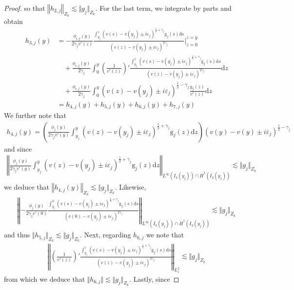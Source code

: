 \documentclass[11pt,reqno]{amsproc}
\theoremstyle{definition}
\numberwithin{equation}{section}
\newcommand{\sr}{{\mathsf{r}}}
\renewcommand{\d}{\mathrm{d}}
\newcommand{\ep}{\varepsilon}
\begin{document}
\begin{proof}
so that $\left \Vert h_{2,j} \right\Vert_{Z_k} \lesssim \Vert g_j \Vert_{Z_k}$. For the last term, we integrate by parts and obtain
\begin{align*}
h_{3,j}(y) &= -\frac{\phi_{\sr,j}(y)}{2\gamma_j v'(z)} \frac{\int_{y_j}^z (v(s) - v(y_j) \pm i\ep_j)^{\frac12+\gamma_j} \mathrm{g}_j(s) \d s }{(v(z) - v(y_j)\pm i\ep_j)^{2\gamma_j} } \Big|_{z=0}^{z=y} \\
&\quad + \frac{\phi_{\sr,j}(y)}{2\gamma_j}\int_0^y \left( \frac{1}{v'(z)} \right)' \frac{\int_{y_j}^z (v(s) - v(y_j) \pm i\ep_j)^{\frac12+\gamma_j} \mathrm{g}_j(s) \d s }{(v(z) - v(y_j)\pm i\ep_j)^{2\gamma_j} }  \d z \\
&\quad + \frac{\phi_{\sr,j}(y)}{2\gamma_j} \int_0^y (v(z) - v(y_j) \pm i\ep_j)^{\frac12-\gamma_j} \frac{\mathrm{g}_j(z)}{v'(z)} \d z \\
&= h_{4,j}(y) + h_{5,j}(y) + h_{6,j}(y) + h_{7,j}(y)
\end{align*}
We further note that
\begin{align*}
h_{4,j}(y) = \left( \frac{\phi_j(y)}{2\gamma_j v'(y)}\int_{y_j}^y (v(z) - v(y_j) \pm i\ep_j)^{\frac12+\gamma_j} \mathrm{g}_j(z) \d z \right) (v(y) - v(y) \pm i\ep_j)^{\frac12-\gamma_j}
\end{align*}
and since
\begin{align*}
\left \Vert \frac{\phi_j(y)}{2\gamma_j v'(y)}\int_{y_j}^y (v(z) - v(y_j) \pm i\ep_j)^{\frac12+\gamma_j} \mathrm{g}_j(z) \d z \right \Vert_{L^\infty(I_3(y_j)) \cap \dot{H}^1(I_3(y_j))} \lesssim \Vert g_j \Vert_{Z_k}
\end{align*}
we deduce that $\left \Vert h_{4,j}(y) \right \Vert_{Z_k} \lesssim \Vert g_j \Vert_{Z_k}$. Likewise, 
\begin{align*}
\left \Vert -\frac{\phi_j(y)}{2\gamma_j v'(0)} \frac{\int_{y_j}^0 (v(s) - v(y_j) \pm i\ep_j)^{\frac12+\gamma_j} \mathrm{g}_j(s) \d s }{(v(0) - v(y_j)\pm i\ep_j)^{2\gamma_j} } \right \Vert_{L^\infty(I_3(y_j)) \cap \dot{H}^1(I_3(y_j))} \lesssim \Vert g_j \Vert_{Z_k}
\end{align*}
and thus $\Vert h_{5,j} \Vert_{Z_k}\lesssim \Vert g_j \Vert_{Z_k}$. Next, regarding $h_{6,j}$ we note that
\begin{align*}
\left \Vert \left( \frac{1}{v'(z)} \right)' \frac{\int_{y_j}^z (v(s) - v(y_j) \pm i\ep_j)^{\frac12+\gamma_j} \mathrm{g}_j(s) \d s }{(v(z) - v(y_j)\pm i\ep_j)^{2\gamma_j} }  \right\Vert_{L^2_z} \lesssim \Vert g_j \Vert_{Z_k} 
\end{align*}
from which we deduce that $\Vert h_{6,j} \Vert \lesssim \Vert g_j \Vert_{Z_k}$. Lastly, since

\end{proof}
\end{document}
